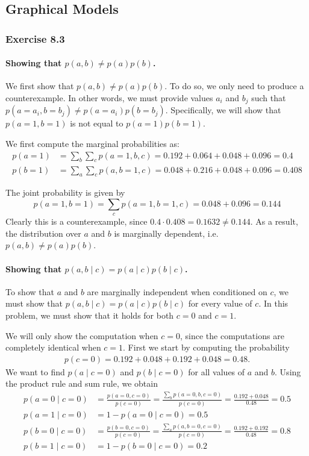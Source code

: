 \documentclass[12pt, a4paper]{article}
\begin{document}
\subsection{Graphical Models}
\subsubsection*{Exercise 8.3}
\paragraph{Showing that $p(a, b) \neq p(a) p(b)$.}
We first show that $p(a, b) \neq p(a) p(b)$.
To do so, we only need to produce a counterexample.
In other words, we must provide values $a_i$ and $b_j$ such that $p(a=a_i, b=b_j) \neq p(a=a_i) p(b=b_j)$. 
Specifically, we will show that $p(a=1, b=1)$ is not equal to $p(a=1) p(b=1)$.

We first compute the marginal probabilities as:
\begin{align*}
	p(a=1) &= \sum_b \sum_c p(a=1, b, c) = 0.192 + 0.064 + 0.048 + 0.096 = 0.4 \\
	p(b=1) &= \sum_a \sum_c p(a, b=1, c) = 0.048 + 0.216 + 0.048 + 0.096 = 0.408
\end{align*}

The joint probability is given by
\begin{equation*}
	p(a=1, b=1) = \sum_c p(a=1, b=1, c)
	= 0.048 + 0.096 = 0.144
\end{equation*}
Clearly this is a counterexample, since $0.4 \cdot 0.408 =   0.1632 \neq 0.144$.
As a result, the distribution over $a$ and $b$ is marginally dependent, i.e. $p(a, b) \neq p(a) p(b)$.

\paragraph{Showing that $p(a, b \mid c) = p(a\mid c) p(b\mid c)$.}
To show that $a$ and $b$ are marginally independent when conditioned on $c$, we must show that $p(a, b \mid c) = p(a\mid c) p(b\mid c)$ for every value of $c$.
In this problem, we must show that it holds for both $c=0$ and $c=1$. 

We will only show the computation when $c=0$, since the computations are completely identical when $c=1$.
First we start by computing the probability
\begin{align*}
	p(c=0) = 0.192 + 0.048 + 0.192 + 0.048 = 0.48.
\end{align*}
We want to find $p(a \mid c=0)$ and $p(b \mid c=0)$ for all values of $a$ and $b$.
Using the product rule and sum rule, we obtain
\begin{align*}
	p(a=0 \mid c=0) &= \frac{p(a=0, c=0)}{p(c=0)} =
	\frac{\sum_b p(a=0, b, c=0)}{p(c=0)} =
	 \frac{0.192 + 0.048}{0.48} = 0.5  \\
	p(a=1 \mid c=0) &=1 - p(a=0 \mid c=0) = 0.5  \\
	p(b=0 \mid c=0) &= \frac{p(b=0, c=0)}{p(c=0)} =
	\frac{\sum_a p(a, b=0, c=0)}{p(c=0)} =
	\frac{0.192 + 0.192}{0.48} = 0.8  \\
	p(b=1 \mid c=0) &= 1 - p(b=0 \mid c=0) = 0.2
\end{align*}
\end{document}
